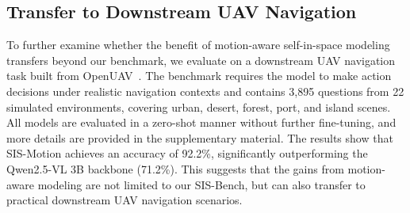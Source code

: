 \documentclass[sigconf, screen, review, anonymous]{acmart}
\newcommand{\choucisan}[1]{\textcolor{purple}{#1}}
\begin{document}
\subsection{Transfer to Downstream UAV Navigation}

To further examine whether the benefit of motion-aware self-in-space modeling transfers beyond our benchmark, we evaluate on a downstream UAV navigation task built from OpenUAV~\cite{wang2024towards}.
The benchmark requires the model to make action decisions under realistic navigation contexts and contains 3{,}895 questions from 22 simulated environments, covering urban, desert, forest, port, and island scenes. All models are evaluated in a zero-shot manner without further fine-tuning, and more details are provided in the supplementary material. The results show that SIS-Motion achieves an accuracy of 92.2\%, significantly outperforming the Qwen2.5-VL 3B backbone (71.2\%). This suggests that the gains from motion-aware modeling are not limited to our SIS-Bench, but can also transfer to practical downstream UAV navigation scenarios.



\end{document}
